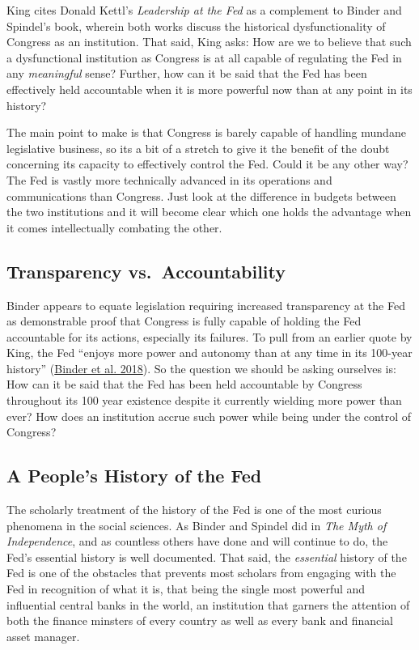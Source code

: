 \documentclass[
  12pt,
]{article}
\begin{document}
King cites Donald Kettl's \emph{Leadership at the Fed} as a complement
to Binder and Spindel's book, wherein both works discuss the historical
dysfunctionality of Congress as an institution. That said, King asks:
How are we to believe that such a dysfunctional institution as Congress
is at all capable of regulating the Fed in any \emph{meaningful} sense?
Further, how can it be said that the Fed has been effectively held
accountable when it is more powerful now than at any point in its
history?

The main point to make is that Congress is barely capable of handling
mundane legislative business, so its a bit of a stretch to give it the
benefit of the doubt concerning its capacity to effectively control the
Fed. Could it be any other way? The Fed is vastly more technically
advanced in its operations and communications than Congress. Just look
at the difference in budgets between the two institutions and it will
become clear which one holds the advantage when it comes intellectually
combating the other.

\hypertarget{transparency-vs.-accountability}{%
\subsection{Transparency
vs.~Accountability}\label{transparency-vs.-accountability}}

Binder appears to equate legislation requiring increased transparency at
the Fed as demonstrable proof that Congress is fully capable of holding
the Fed accountable for its actions, especially its failures. To pull
from an earlier quote by King, the Fed ``enjoys more power and autonomy
than at any time in its 100-year history''
(\protect\hyperlink{ref-binder2018c}{Binder et al. 2018}). So the
question we should be asking ourselves is: How can it be said that the
Fed has been held accountable by Congress throughout its 100 year
existence despite it currently wielding more power than ever? How does
an institution accrue such power while being under the control of
Congress?

\hypertarget{a-peoples-history-of-the-fed}{%
\subsection{A People's History of the
Fed}\label{a-peoples-history-of-the-fed}}

The scholarly treatment of the history of the Fed is one of the most
curious phenomena in the social sciences. As Binder and Spindel did in
\emph{The Myth of Independence}, and as countless others have done and
will continue to do, the Fed's essential history is well documented.
That said, the \emph{essential} history of the Fed is one of the
obstacles that prevents most scholars from engaging with the Fed in
recognition of what it is, that being the single most powerful and
influential central banks in the world, an institution that garners the
attention of both the finance minsters of every country as well as every
bank and financial asset manager.
\end{document}
